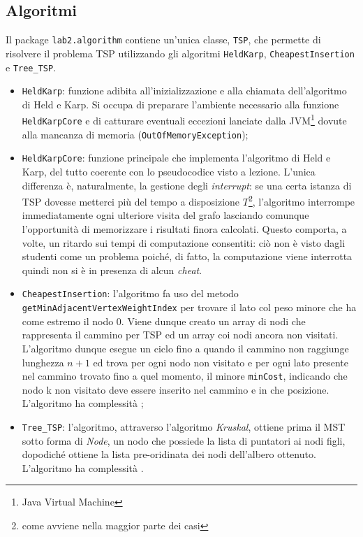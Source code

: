 \subsection{Algoritmi}
Il package \texttt{lab2.algorithm} contiene un'unica classe, \texttt{TSP}, che permette di risolvere il problema TSP utilizzando gli algoritmi \texttt{HeldKarp}, \texttt{CheapestInsertion} e \texttt{Tree\_TSP}.
\begin{itemize}
	\item \texttt{HeldKarp}: funzione adibita all'inizializzazione e alla chiamata dell'algoritmo di Held e Karp. Si occupa di preparare l'ambiente necessario alla funzione \texttt{HeldKarpCore} e di catturare eventuali eccezioni lanciate dalla JVM\footnote{Java Virtual Machine} dovute alla mancanza di memoria (\texttt{OutOfMemoryException});
	\item \texttt{HeldKarpCore}: funzione principale che implementa l'algoritmo di Held e Karp, del tutto coerente con lo pseudocodice visto a lezione. L'unica differenza è, naturalmente, la gestione degli \textit{interrupt}: se una certa istanza di TSP dovesse metterci più del tempo a disposizione $T$\footnote{come avviene nella maggior parte dei casi}, l'algoritmo interrompe immediatamente ogni ulteriore visita del grafo lasciando comunque l'opportunità di memorizzare i risultati finora calcolati. Questo comporta, a volte, un ritardo sui tempi di computazione consentiti: ciò non è visto dagli studenti come un problema poiché, di fatto, la computazione viene interrotta quindi non si è in presenza di alcun \textit{cheat}.
	\item \texttt{CheapestInsertion}: l'algoritmo fa uso del metodo \texttt{getMinAdjacentVertexWeightIndex} per trovare il lato col peso minore che ha come estremo il nodo 0. Viene dunque creato un array di nodi che rappresenta il cammino per TSP ed un array coi nodi ancora non visitati. L'algoritmo dunque esegue un ciclo fino a quando il cammino non raggiunge lunghezza $n+1$ ed trova per ogni nodo non visitato e per ogni lato presente nel cammino trovato fino a quel momento, il minore \texttt{minCost}, indicando che nodo k non visitato deve essere inserito nel cammino e in che posizione. L'algoritmo ha complessità ;
	\item \texttt{Tree\_TSP}: l'algoritmo, attraverso l'algoritmo \textit{Kruskal}, ottiene prima il MST sotto forma di \textit{Node}, un nodo che possiede la lista di puntatori ai nodi figli, dopodiché ottiene la lista pre-oridinata dei nodi dell'albero ottenuto. L'algoritmo ha complessità .
\end{itemize}

